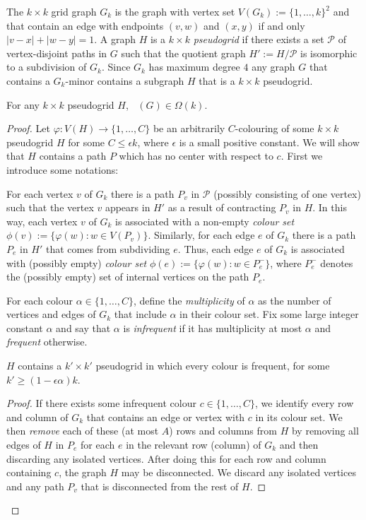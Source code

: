\documentclass{patmorin}
\DeclareMathOperator{\chilin}{\chi_{\mathrm{lin}}}
\begin{document}
The $k\times k$ grid graph $G_k$ is the graph with vertex set $V(G_k):=\{1,\ldots,k\}^2$ and that contain an edge with endpoints $(v,w)$ and $(x,y)$ if and only $|v-x|+|w-y|=1$.  A graph $H$ is a $k\times k$ \emph{pseudogrid} if there exists a set $\mathcal{P}$ of vertex-disjoint paths in $G$ such that the quotient graph $H':=H/\mathcal{P}$ is isomorphic to a subdivision of $G_k$.  Since $G_k$ has maximum degree $4$ any graph $G$ that contains a $G_k$-minor contains a subgraph $H$ that is a $k\times k$ pseudogrid.


\begin{lem}
  For any $k\times k$ pseudogrid $H$, $\chilin(G)\in\Omega(k)$.
\end{lem}

\begin{proof}
  Let $\varphi:V(H)\to\{1,\ldots,C\}$ be an arbitrarily $C$-colouring of some $k\times k$ pseudogrid $H$ for some $C\le \epsilon k$, where $\epsilon$ is a small positive constant.  We will show that $H$ contains a path $P$ which has no center with respect to $c$.  First we introduce some notations: 

  For each vertex $v$ of $G_k$ there is a path $P_v$ in $\mathcal{P}$ (possibly consisting of one vertex) such that the vertex $v$ appears in $H'$ as a result of contracting $P_v$ in $H$.  In this way, each vertex $v$ of $G_k$ is associated with a non-empty \emph{colour set} $\phi(v):=\{\varphi(w):w\in V(P_v)\}$.  Similarly, for each edge $e$ of $G_k$ there is a path $P_e$ in $H'$ that comes from subdividing $e$.  Thus, each edge $e$ of $G_k$ is associated with (possibly empty) \emph{colour set} $\phi(e):=\{\varphi(w):w\in P^-_e\}$, where $P^-_e$ denotes the (possibly empty) set of internal vertices on the path $P_e$.
  
  For each colour $\alpha\in\{1,\ldots,C\}$, define the \emph{multiplicity} of $\alpha$ as the number of vertices and edges of $G_k$ that include $\alpha$ in their colour set.  Fix some large integer constant $\alpha$ and say that $\alpha$ is \emph{infrequent} if it has multiplicity at most $\alpha$ and \emph{frequent} otherwise.  
  
  \begin{clm}\label{all_frequent}
    $H$ contains a $k'\times k'$ pseudogrid in which every colour is frequent, for some $k'\ge (1-\epsilon \alpha)k$.
  \end{clm}
  
  \begin{proof}
    If there exists some infrequent colour $c\in\{1,\ldots,C\}$, we identify every row and column of $G_k$ that contains an edge or vertex with $c$ in its colour set.  We then \emph{remove} each of these (at most $A$) rows and columns from $H$ by removing all edges of $H$ in $P_e$ for each $e$ in the relevant row (column) of $G_k$ and then discarding any isolated vertices.  After doing this for each row and column containing $c$, the graph $H$ may be disconnected.  We discard any isolated vertices and any path $P_{v}$ that is disconnected from the rest of $H$.  
     

\end{proof}
\end{proof}
\end{document}
